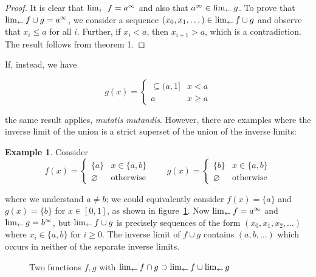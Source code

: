 \documentclass{article}
\theoremstyle{definition}
\newtheorem{exam}[thm]{Example}
\let\emptyset\varnothing
\begin{document}
\begin{proof}
  It is clear that $\lim_{\leftarrow} f=a^\infty$ and
  also that $a^\infty\in\lim_{\leftarrow} g$.  To prove that $\lim_{\leftarrow} f\cup g=a^\infty$,
  we consider a sequence $(x_0,x_1,\dots)\in\lim_{\leftarrow} f\cup g$ and
  observe that $x_i\leqslant a$ for all $i$.  Further, if $x_i<a$,
  then $x_{i+1}>a$, which is a contradiction.  The result follows from
  theorem 1.
\end{proof}

If, instead, we have

\begin{equation}
  g(x) = \begin{cases}
    \subseteq(a,1] & x<a\\
 a & x\geqslant a
    \end{cases}
\end{equation}

the same result applies, {\em mutatis mutandis}.  However, there are
examples where the inverse limit of the union is a strict superset of 
the union of the inverse limits:

\begin{exam}
Consider
\begin{equation}
  f(x) = \begin{cases}
\lbrace a\rbrace & x\in\lbrace a,b\rbrace\\
\emptyset & \mbox{otherwise}
    \end{cases}\qquad
  g(x) = \begin{cases}
\lbrace b\rbrace & x\in\lbrace a,b\rbrace\\
\emptyset & \mbox{otherwise}
    \end{cases}
\end{equation}

  where we understand $a\neq b$; we could equivalently consider
  $f(x)=\lbrace a\rbrace$ and $g(x)=\lbrace b\rbrace$ for $x\in[0,1]$,
  as shown in figure~\ref{strictly}.  Now $\lim_{\leftarrow} f=a^\infty$ and
  $\lim_{\leftarrow} g=b^\infty$, but $\lim_{\leftarrow} f \cup g$ is precisely
  sequences of the form $(x_0,x_1,x_2,\ldots)$ where $x_i\in\lbrace
  a,b\rbrace$ for $i\geqslant 0$.  The inverse limit of $f\cup g$
  contains $(a,b,\ldots)$ which occurs in neither of the separate
  inverse limits.
\end{exam}

\begin{figure}[h]
\caption{Two \label{strictly} functions $f,g$ with $\lim_{\leftarrow} f\cap g\supset\lim_{\leftarrow} f\cup\lim_{\leftarrow} g$}
\end{figure}
\end{document}
